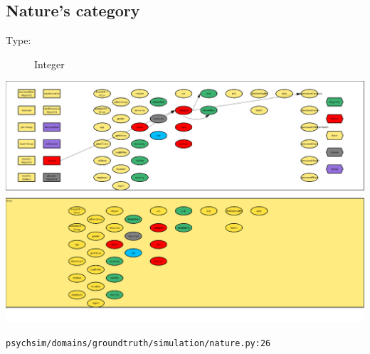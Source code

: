 \documentclass{article}%
\begin{document}
%
\subsection{Nature's category}%
\label{subsec:Nature's category}%
\begin{description}%
\item[Type:]%
Integer%
\end{description}%
\includegraphics[width=\textwidth]{images/categoryOfNature.png}%
\begin{flushleft}%
\verb|psychsim/domains/groundtruth/simulation/nature.py:26|%
\end{flushleft}%
\end{document}
